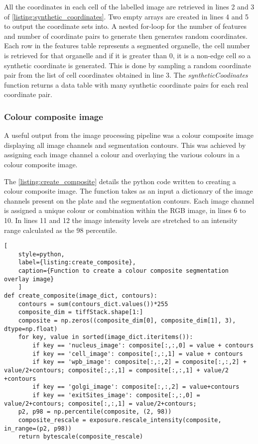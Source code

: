 All the coordinates in each cell of the labelled image are retrieved in lines 2 and 3 of \autoref{listing:synthetic_coordinates}. Two empty arrays are created in lines 4 and 5 to output the coordinate sets into. A nested for-loop for the number of features and number of coordinate pairs to generate then generates random coordinates. Each row in the features table represents a segmented organelle, the cell number is retrieved for that organelle and if it is greater than 0, it is a non-edge cell so a synthetic coordinate is generated. This is done by sampling a random coordinate pair from the list of cell coordinates obtained in line 3. The \emph{syntheticCoodinates} function returns a data table with many synthetic coordinate pairs for each real coordinate pair.

\subsubsection{Colour composite image}
A useful output from the image processing pipeline was a colour composite image displaying all image channels and segmentation contours. This was achieved by assigning each image channel a colour and overlaying the various colours in a colour composite image.

The \autoref{listing:create_composite} details the python code written to creating a colour composite image. The function takes as an input a dictionary of the image channels present on the plate and the segmentation contours. Each image channel is assigned a unique colour or combination within the RGB image, in lines 6 to 10. In lines 11 and 12 the image intensity levels are stretched to an intensity range calculated as the 98 percentile.

\begin{lstlisting}[
	style=python,
	label={listing:create_composite},
	caption={Function to create a colour composite segmentation overlay image}
	]
def create_composite(image_dict, contours):
    contours = sum(contours_dict.values())*255
    composite_dim = tiffStack.shape[1:]
    composite = np.zeros((composite_dim[0], composite_dim[1], 3), dtype=np.float)
    for key, value in sorted(image_dict.iteritems()):
        if key == 'nucleus_image': composite[:,:,0] = value + contours
        if key == 'cell_image': composite[:,:,1] = value + contours
        if key == 'wpb_image': composite[:,:,2] = composite[:,:,2] + value/2+contours; composite[:,:,1] = composite[:,:,1] + value/2 +contours
        if key == 'golgi_image': composite[:,:,2] = value+contours
        if key == 'exitSites_image': composite[:,:,0] = value/2+contours; composite[:,:,1] = value/2+contours;
    p2, p98 = np.percentile(composite, (2, 98))
    composite_rescale = exposure.rescale_intensity(composite, in_range=(p2, p98))
    return bytescale(composite_rescale)
\end{lstlisting}

